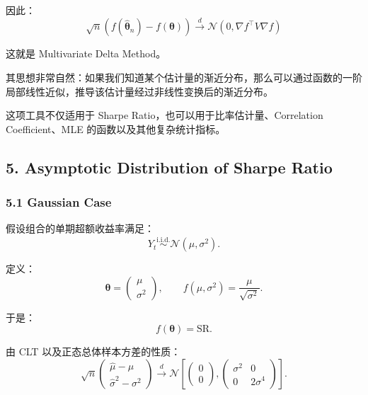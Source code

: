 因此：
\[\boxed{
\sqrt n
\left(
f(\hat{\boldsymbol\theta}_n)
-f(\boldsymbol\theta)
\right)
\xrightarrow{d}
\mathcal N
\left(
0,\nabla f^\top V\nabla f
\right)
}\]

这就是 Multivariate Delta Method。

其思想非常自然：如果我们知道某个估计量的渐近分布，那么可以通过函数的一阶局部线性近似，推导该估计量经过非线性变换后的渐近分布。


这项工具不仅适用于 Sharpe Ratio，也可以用于比率估计量、Correlation Coefficient、MLE 的函数以及其他复杂统计指标。

\hypertarget{part-4-67-0001-asymptotic-distribution-of-sharpe-ratio}{%
\subsection{5. Asymptotic Distribution of Sharpe Ratio}\label{part-4-67-0001-asymptotic-distribution-of-sharpe-ratio}}

\hypertarget{part-4-67-0001-gaussian-case}{%
\subsubsection{5.1 Gaussian Case}\label{part-4-67-0001-gaussian-case}}

假设组合的单期超额收益率满足：
\[Y_t\overset{\mathrm{i.i.d.}}{\sim}
\mathcal N(\mu,\sigma^2).\]

定义：
\[\boldsymbol\theta=
\begin{pmatrix}
\mu\\
\sigma^2
\end{pmatrix},
\qquad
f(\mu,\sigma^2)
=
\frac{\mu}{\sqrt{\sigma^2}}.\]

于是：
\[f(\boldsymbol\theta)=\mathrm{SR}.\]

由 CLT 以及正态总体样本方差的性质：
\[\sqrt n
\begin{pmatrix}
\hat\mu-\mu\\
\hat\sigma^2-\sigma^2
\end{pmatrix}
\xrightarrow{d}
\mathcal N
\left[
\begin{pmatrix}
0\\0
\end{pmatrix},
\begin{pmatrix}
\sigma^2&0\\
0&2\sigma^4
\end{pmatrix}
\right].\]

